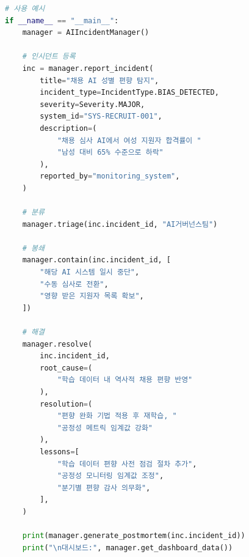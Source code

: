 \begin{lstlisting}[language=Python, caption={AI 인시던트 관리 시스템}, label={lst:incident_mgmt}]
# 사용 예시
if __name__ == "__main__":
    manager = AIIncidentManager()

    # 인시던트 등록
    inc = manager.report_incident(
        title="채용 AI 성별 편향 탐지",
        incident_type=IncidentType.BIAS_DETECTED,
        severity=Severity.MAJOR,
        system_id="SYS-RECRUIT-001",
        description=(
            "채용 심사 AI에서 여성 지원자 합격률이 "
            "남성 대비 65% 수준으로 하락"
        ),
        reported_by="monitoring_system",
    )

    # 분류
    manager.triage(inc.incident_id, "AI거버넌스팀")

    # 봉쇄
    manager.contain(inc.incident_id, [
        "해당 AI 시스템 일시 중단",
        "수동 심사로 전환",
        "영향 받은 지원자 목록 확보",
    ])

    # 해결
    manager.resolve(
        inc.incident_id,
        root_cause=(
            "학습 데이터 내 역사적 채용 편향 반영"
        ),
        resolution=(
            "편향 완화 기법 적용 후 재학습, "
            "공정성 메트릭 임계값 강화"
        ),
        lessons=[
            "학습 데이터 편향 사전 점검 절차 추가",
            "공정성 모니터링 임계값 조정",
            "분기별 편향 감사 의무화",
        ],
    )

    print(manager.generate_postmortem(inc.incident_id))
    print("\n대시보드:", manager.get_dashboard_data())
\end{lstlisting}

